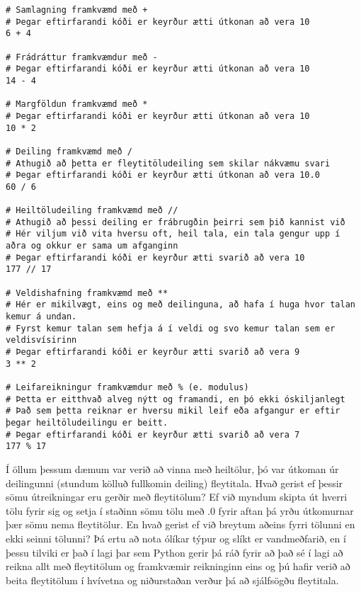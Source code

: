 \begin{lstlisting}[caption=Reikniaðgerðir, label=lst:reiknadg]
# Samlagning framkvæmd með + 
# Þegar eftirfarandi kóði er keyrður ætti útkonan að vera 10
6 + 4 

# Frádráttur framkvæmdur með -
# Þegar eftirfarandi kóði er keyrður ætti útkonan að vera 10
14 - 4 

# Margföldun framkvæmd með * 
# Þegar eftirfarandi kóði er keyrður ætti útkonan að vera 10
10 * 2 

# Deiling framkvæmd með / 
# Athugið að þetta er fleytitöludeiling sem skilar nákvæmu svari
# Þegar eftirfarandi kóði er keyrður ætti útkonan að vera 10.0
60 / 6 

# Heiltöludeiling framkvæmd með //
# Athugið að þessi deiling er frábrugðin þeirri sem þið kannist við
# Hér viljum við vita hversu oft, heil tala, ein tala gengur upp í aðra og okkur er sama um afganginn
# Þegar eftirfarandi kóði er keyrður ætti svarið að vera 10
177 // 17

# Veldishafning framkvæmd með **
# Hér er mikilvægt, eins og með deilinguna, að hafa í huga hvor talan kemur á undan.
# Fyrst kemur talan sem hefja á í veldi og svo kemur talan sem er veldisvísirinn
# Þegar eftirfarandi kóði er keyrður ætti svarið að vera 9
3 ** 2

# Leifareikningur framkvæmdur með % (e. modulus)
# Þetta er eitthvað alveg nýtt og framandi, en þó ekki óskiljanlegt
# Það sem þetta reiknar er hversu mikil leif eða afgangur er eftir þegar heiltöludeilingu er beitt.
# Þegar eftirfarandi kóði er keyrður ætti svarið að vera 7
177 % 17

\end{lstlisting}

Í öllum þessum dæmum var verið að vinna með heiltölur, þó var útkoman úr deilingunni (stundum kölluð fullkomin deiling) fleytitala. 
Hvað gerist ef þessir sömu útreikningar eru gerðir með fleytitölum? 
Ef við myndum skipta út hverri tölu fyrir sig og setja í staðinn sömu tölu með .0 fyrir aftan þá yrðu útkomurnar þær sömu nema fleytitölur. 
En hvað gerist ef við breytum aðeins fyrri tölunni en ekki seinni tölunni?
Þá ertu að nota ólíkar týpur og slíkt er vandmeðfarið, en í þessu tilviki er það í lagi þar sem Python gerir þá ráð fyrir að það sé í lagi að reikna allt með fleytitölum og framkvæmir reikninginn eins og þú hafir verið að beita fleytitölum í hvívetna og niðurstaðan verður þá að sjálfsögðu fleytitala.

